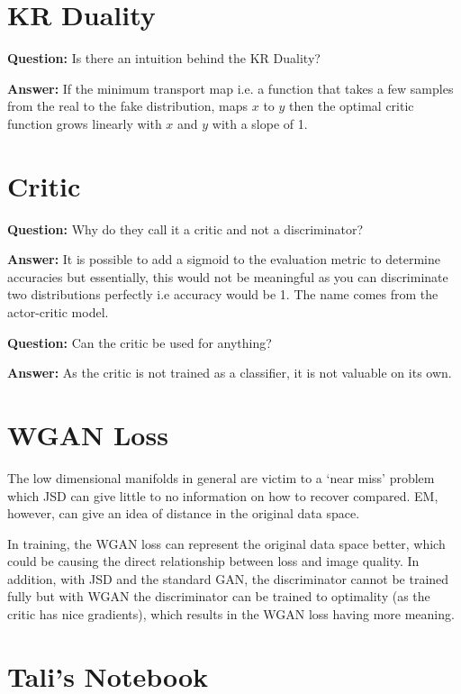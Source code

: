 \documentclass{article}
\begin{document}
\section{KR Duality} 

\textbf{Question:} Is there an intuition behind the KR Duality?

\textbf{Answer:} If the minimum transport map i.e. a function that takes a few samples from the real to the fake  distribution, maps $x$ to $y$ then the optimal critic function grows linearly with $x$ and $y$ with a slope of 1.

\section{Critic}

\textbf{Question:} Why do they call it a critic and not a discriminator?

\textbf{Answer:} It is possible to add a sigmoid to the evaluation metric to determine accuracies but essentially, this would not be meaningful as you can discriminate two distributions perfectly i.e accuracy would be 1. The name comes from the actor-critic model. 

\textbf{Question:} Can the critic be used for anything?

\textbf{Answer:}  As the critic is not trained as a classifier, it is not valuable on its own.

\section{WGAN Loss}

The low dimensional manifolds in general are victim to a `near miss' problem which JSD can give little to no information on how to recover compared. EM, however, can give an idea of distance in the original data space. 

In training, the WGAN loss can represent the original data space better, which could be causing the direct relationship between loss and image quality. In addition, with JSD and the standard GAN, the discriminator cannot be trained fully but with WGAN the discriminator can be trained to optimality (as the critic has nice gradients), which results in the WGAN loss having more meaning. 

\section{Tali's Notebook}
\end{document}
